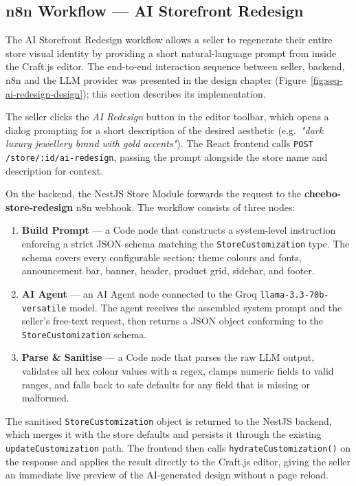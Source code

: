 \documentclass[12pt, a4paper, oneside]{report}
\begin{document}
\subsection{n8n Workflow --- AI Storefront Redesign}

The AI Storefront Redesign workflow allows a seller to regenerate their
entire store visual identity by providing a short natural-language prompt
from inside the Craft.js editor. The end-to-end interaction sequence
between seller, backend, n8n and the LLM provider was presented in the
design chapter (Figure~\ref{fig:seq-ai-redesign-design}); this section
describes its implementation.

The seller clicks the \textit{AI Redesign} button in the editor toolbar,
which opens a dialog prompting for a short description of the desired
aesthetic (e.g.\ \textit{"dark luxury jewellery brand with gold accents"}).
The React frontend calls \texttt{POST /store/:id/ai-redesign}, passing the
prompt alongside the store name and description for context.

On the backend, the NestJS Store Module forwards the request to the
\textbf{cheebo-store-redesign} n8n webhook.
The workflow consists of three nodes:

\begin{enumerate}
  \item \textbf{Build Prompt} --- a Code node that constructs a
        system-level instruction enforcing a strict JSON schema matching
        the \texttt{StoreCustomization} type. The schema covers every
        configurable section: theme colours and fonts, announcement bar,
        banner, header, product grid, sidebar, and footer.

  \item \textbf{AI Agent} --- an AI Agent node connected to the Groq
        \texttt{llama-3.3-70b-versatile} model. The agent receives the
        assembled system prompt and the seller's free-text request, then
        returns a JSON object conforming to the \texttt{StoreCustomization}
        schema.

  \item \textbf{Parse \& Sanitise} --- a Code node that parses the raw
        LLM output, validates all hex colour values with a regex, clamps
        numeric fields to valid ranges, and falls back to safe defaults for
        any field that is missing or malformed.
\end{enumerate}

The sanitised \texttt{StoreCustomization} object is returned to the NestJS
backend, which merges it with the store defaults and persists it through
the existing \texttt{updateCustomization} path. The frontend then calls
\texttt{hydrateCustomization()} on the response and applies the result
directly to the Craft.js editor, giving the seller an immediate live
preview of the AI-generated design without a page reload.
\end{document}
